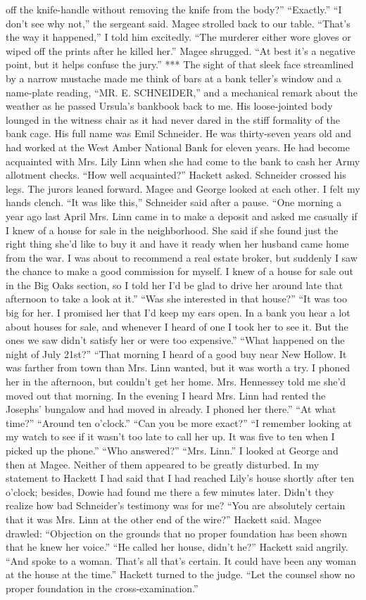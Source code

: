 \documentclass{novel}
\begin{document}
off the knife-handle without removing the knife from the body?” “Exactly.” “I don’t see why not,” the sergeant said. Magee strolled back to our table. “That’s the way it happened,” I told him excitedly. “The murderer either wore gloves or wiped off the prints after he killed her.” Magee shrugged. “At best it’s a negative point, but it helps confuse the jury.” *** The sight of that sleek face streamlined by a narrow mustache made me think of bars at a bank teller’s window and a name-plate reading, “MR. E. SCHNEIDER,” and a mechanical remark about the weather as he passed Ursula’s bankbook back to me. His loose-jointed body lounged in the witness chair as it had never dared in the stiff formality of the bank cage. His full name was Emil Schneider. He was thirty-seven years old and had worked at the West Amber National Bank for eleven years. He had become acquainted with Mrs. Lily Linn when she had come to the bank to cash her Army allotment checks. “How well acquainted?” Hackett asked. Schneider crossed his legs. The jurors leaned forward. Magee and George looked at each other. I felt my hands clench. “It was like this,” Schneider said after a pause. “One morning a year ago last April Mrs. Linn came in to make a deposit and asked me casually if I knew of a house for sale in the neighborhood. She said if she found just the right thing she’d like to buy it and have it ready when her husband came home from the war. I was about to recommend a real estate broker, but suddenly I saw the chance to make a good commission for myself. I knew of a house for sale out in the Big Oaks section, so I told her I’d be glad to drive her around late that afternoon to take a look at it.” “Was she interested in that house?” “It was too big for her. I promised her that I’d keep my ears open. In a bank you hear a lot about houses for sale, and whenever I heard of one I took her to see it. But the ones we saw didn’t satisfy her or were too expensive.” “What happened on the night of July 21st?” “That morning I heard of a good buy near New Hollow. It was farther from town than Mrs. Linn wanted, but it was worth a try. I phoned her in the afternoon, but couldn’t get her home. Mrs. Hennessey told me she’d moved out that morning. In the evening I heard Mrs. Linn had rented the Josephs’ bungalow and had moved in already. I phoned her there.” “At what time?” “Around ten o’clock.” “Can you be more exact?” “I remember looking at my watch to see if it wasn’t too late to call her up. It was five to ten when I picked up the phone.” “Who answered?” “Mrs. Linn.” I looked at George and then at Magee. Neither of them appeared to be greatly disturbed. In my statement to Hackett I had said that I had reached Lily’s house shortly after ten o’clock; besides, Dowie had found me there a few minutes later. Didn’t they realize how bad Schneider’s testimony was for me? “You are absolutely certain that it was Mrs. Linn at the other end of the wire?” Hackett said. Magee drawled: “Objection on the grounds that no proper foundation has been shown that he knew her voice.” “He called her house, didn’t he?” Hackett said angrily. “And spoke to a woman. That’s all that’s certain. It could have been any woman at the house at the time.” Hackett turned to the judge. “Let the counsel show no proper foundation in the cross-examination.” 
\end{document}
